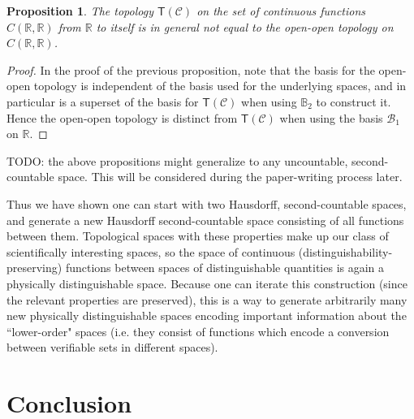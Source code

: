 \documentclass[review]{elsarticle}
\theoremstyle{plain}%
\newtheorem{prop}[thm]{Proposition}
\theoremstyle{definition}
\theoremstyle{remark}
\begin{document}
\begin{prop}
The topology $\mathsf{T}(\mathcal{C})$ on the set of continuous functions $C(\mathbb{R},\mathbb{R})$ from $\mathbb{R}$ to itself is in general not equal to the open-open topology on $C(\mathbb{R},\mathbb{R})$.
\end{prop}
\begin{proof}
In the proof of the previous proposition, note that the basis for the open-open topology is independent of the basis used for the underlying spaces, and in particular is a superset of the basis for $\mathsf{T}(\mathcal{C})$ when using $\mathbb{B}_2$ to construct it. Hence the open-open topology is distinct from $\mathsf{T}(\mathcal{C})$ when using the basis $\mathcal{B}_1$ on $\mathbb{R}$. 
\end{proof}

TODO: the above propositions might generalize to any uncountable, second-countable space. This will be considered during the paper-writing process later. 

Thus we have shown one can start with two Hausdorff, second-countable spaces, and generate a new Hausdorff second-countable space consisting of all functions between them. Topological spaces with these properties make up our class of scientifically interesting spaces, so the space of continuous (distinguishability-preserving) functions between spaces of distinguishable quantities is again a physically distinguishable space. Because one can iterate this construction (since the relevant properties are preserved), this is a way to generate arbitrarily many new physically distinguishable spaces encoding important information about the ``lower-order" spaces (i.e. they consist of functions which encode a conversion between verifiable sets in different spaces).


\section{Conclusion}
\end{document}

